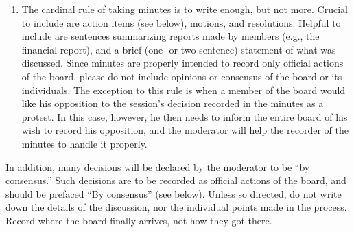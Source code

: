 \documentclass[
]{book}
\providecommand{\tightlist}{%
  \setlength{\itemsep}{0pt}\setlength{\parskip}{0pt}}
\begin{document}
\begin{enumerate}
\def\labelenumi{\arabic{enumi}.}
\setcounter{enumi}{6}
\tightlist
\item
  The cardinal rule of taking minutes is to write enough, but not more. Crucial to include are action items (see below), motions, and resolutions. Helpful to include are sentences summarizing reports made by members (e.g., the financial report), and a brief (one- or two-sentence) statement of what was discussed. Since minutes are properly intended to record only official actions of the board, please do not include opinions or consensus of the board or its individuals. The exception to this rule is when a member of the board would like his opposition to the session's decision recorded in the minutes as a protest. In this case, however, he then needs to inform the entire board of his wish to record his opposition, and the moderator will help the recorder of the minutes to handle it properly.
\end{enumerate}

In addition, many decisions will be declared by the moderator to be ``by consensus.'' Such decisions are to be recorded as official actions of the board, and should be prefaced ``By consensus'' (see below). Unless so directed, do not write down the details of the discussion, nor the individual points made in the process. Record where the board finally arrives, not how they got there.
\end{document}

